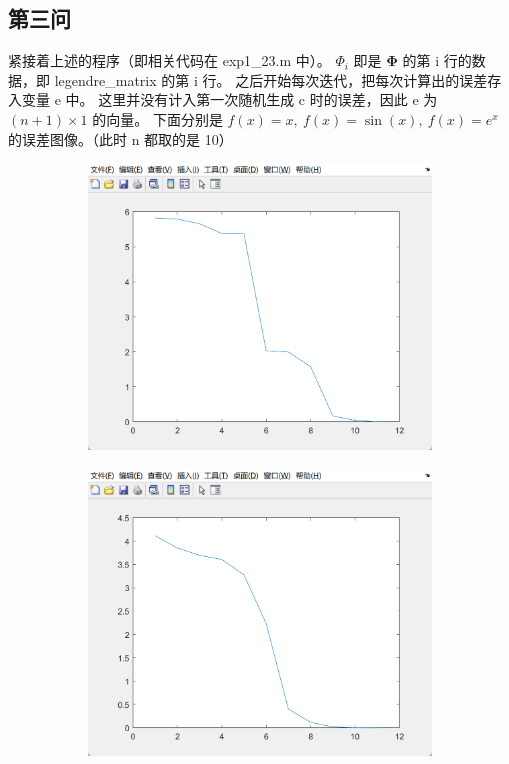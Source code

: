 \subsection{第三问}
紧接着上述的程序（即相关代码在 exp1\_23.m 中）。
\(\Phi_{i}\) 即是 \(\mathbf{\Phi}\) 的第 i 行的数据，即 legendre\_matrix 的第 i 行。
之后开始每次迭代，把每次计算出的误差存入变量 e 中。
这里并没有计入第一次随机生成 c 时的误差，因此 e 为 \((n+1)\times 1\) 的向量。
下面分别是 \(f(x)=x,\ f(x)=\sin(x),\ f(x)=e^x\) 的误差图像。（此时 n 都取的是 10）
\begin{figure}[H]
	\centering
	\begin{subfigure}[t]{0.3\textwidth}
		\centering
		\includegraphics[width=\textwidth]{./picture/exp1_3_1}
		\caption{}
		\label{fig:a}
	\end{subfigure}
	\begin{subfigure}[t]{0.3\textwidth}
		\centering
		\includegraphics[width=\textwidth]{./picture/exp1_3_2}

\end{subfigure}
\end{figure}
